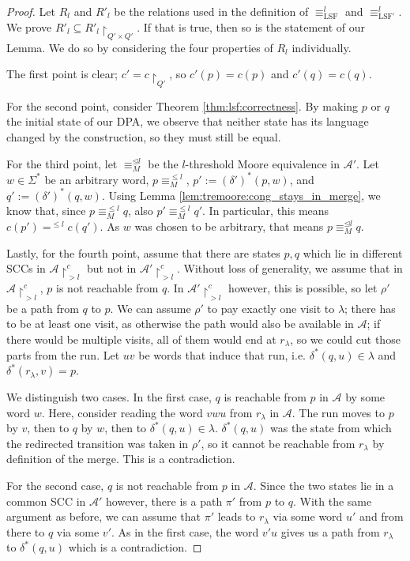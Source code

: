 \begin{proof}
	Let $R_l$ and $R'_l$ be the relations used in the definition of $\equiv_\text{LSF}^l$ and $\equiv_\text{LSF'}^l$. We prove $R'_l \subseteq R'_l \upharpoonright_{Q' \times Q'}$. If that is true, then so is the statement of our Lemma. We do so by considering the four properties of $R_l$ individually.
	
	The first point is clear; $c' = c \upharpoonright_{Q'}$, so $c'(p) = c(p)$ and $c'(q) = c(q)$.
	
	For the second point, consider Theorem \ref{thm:lsf:correctness}. By making $p$ or $q$ the initial state of our DPA, we observe that neither state has its language changed by the construction, so they must still be equal.
	
	For the third point, let $\equiv_M^{\unlhd l}$ be the $l$-threshold Moore equivalence in $\mathcal{A}'$. Let $w \in \Sigma^*$ be an arbitrary word, $p \equiv_M^{\leq l}$, $p' := (\delta')^*(p, w)$, and $q' := (\delta')^*(q, w)$. Using Lemma \ref{lem:tremoore:cong_stays_in_merge}, we know that, since $p \equiv_M^{\leq l} q$, also $p' \equiv_M^{\leq l} q'$. In particular, this means $c(p') =^{\leq l} c(q')$. As $w$ was chosen to be arbitrary, that means $p \equiv_M^{\unlhd l} q$.
	
	Lastly, for the fourth point, assume that there are states $p, q$ which lie in different SCCs in $\mathcal{A} \upharpoonright^c_{> l}$ but not in $\mathcal{A}' \upharpoonright^c_{> l}$. Without loss of generality, we assume that in $\mathcal{A} \upharpoonright^c_{> l}$, $p$ is not reachable from $q$. In $\mathcal{A}' \upharpoonright^c_{> l}$ however, this is possible, so let $\rho'$ be a path from $q$ to $p$. We can assume $\rho'$ to pay exactly one visit to $\lambda$; there has to be at least one visit, as otherwise the path would also be available in $\mathcal{A}$; if there would be multiple visits, all of them would end at $r_\lambda$, so we could cut those parts from the run. Let $uv$ be words that induce that run, i.e. $\delta^*(q, u) \in \lambda$ and $\delta^*(r_\lambda, v) = p$.
	
	We distinguish two cases. In the first case, $q$ is reachable from $p$ in $\mathcal{A}$ by some word $w$. Here, consider reading the word $vwu$ from $r_\lambda$ in $\mathcal{A}$. The run moves to $p$ by $v$, then to $q$ by $w$, then to $\delta^*(q, u) \in \lambda$. $\delta^*(q, u)$ was the state from which the redirected transition was taken in $\rho'$, so it cannot be reachable from $r_\lambda$ by definition of the merge. This is a contradiction.
	
	For the second case, $q$ is not reachable from $p$ in $\mathcal{A}$. Since the two states lie in a common SCC in $\mathcal{A}'$ however, there is a path $\pi'$ from $p$ to $q$. With the same argument as before, we can assume that $\pi'$ leads to $r_\lambda$ via some word $u'$ and from there to $q$ via some $v'$. As in the first case, the word $v' u$ gives us a path from $r_\lambda$ to $\delta^*(q, u)$ which is a contradiction.
\end{proof}

